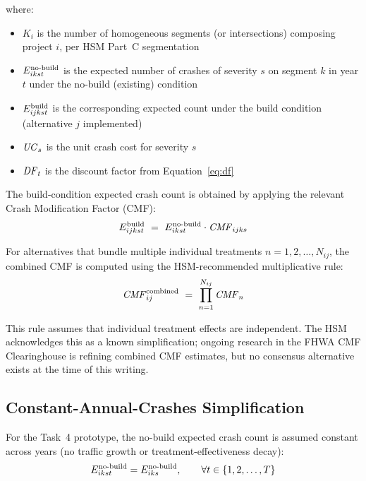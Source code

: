 \noindent where:
\begin{itemize}[leftmargin=2em, itemsep=2pt]
  \item $K_i$ is the number of homogeneous segments (or intersections)
    composing project $i$, per HSM Part~C segmentation
  \item $E^{\mathrm{no\text{-}build}}_{ikst}$ is the expected number of crashes of severity $s$
    on segment $k$ in year $t$ under the no-build (existing) condition
  \item $E^{\mathrm{build}}_{ijkst}$ is the corresponding expected count under the build
    condition (alternative $j$ implemented)
  \item $\mathit{UC}_s$ is the unit crash cost for severity $s$
  \item $\mathit{DF}_t$ is the discount factor from Equation~\ref{eq:df}
\end{itemize}

The build-condition expected crash count is obtained by applying the relevant
Crash Modification Factor (CMF):
\begin{equation}
E^{\mathrm{build}}_{ijkst}\ =\ E^{\mathrm{no\text{-}build}}_{ikst} \cdot \mathit{CMF}_{ijks}
\label{eq:build-crashes}
\end{equation}

\noindent For alternatives that bundle multiple individual treatments
$n = 1, 2, \ldots, N_{ij}$, the combined CMF is computed using the
HSM-recommended multiplicative rule:
\begin{equation}
\CMF^{\mathrm{combined}}_{ij}\ =\ \prod_{n=1}^{N_{ij}} \CMF_n
\label{eq:cmf-combine}
\end{equation}

This rule assumes that individual treatment effects are independent. The HSM
acknowledges this as a known simplification; ongoing research in the FHWA CMF
Clearinghouse is refining combined CMF estimates, but no consensus alternative
exists at the time of this writing.

\subsection{Constant-Annual-Crashes Simplification}

For the Task~4 prototype, the no-build expected crash count is assumed
constant across years (no traffic growth or treatment-effectiveness decay):
\begin{equation*}
E^{\mathrm{no\text{-}build}}_{ikst} = E^{\mathrm{no\text{-}build}}_{iks}, \qquad \forall t \in \{1, 2, \ldots, T\}
\end{equation*}

